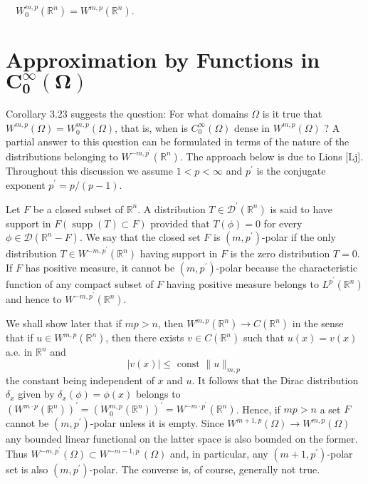 \begin{corollary}
  $\quad W_0^{m, p}\left(\mathbb{R}^n\right)=W^{m, p}\left(\mathbb{R}^n\right)$.
\end{corollary}


\section[Approximation by Functions in $C_0^\infty (\Omega)$]%
  {Approximation by Functions in $\bm{C_0^\infty (\Omega)}$}


\begin{para}
  Corollary 3.23 suggests the question: For what domains $\Omega$ is it true that $W^{m, p}(\Omega)=W_0^{m, p}(\Omega)$, that is, when is $C_0^{\infty}(\Omega)$ dense in $W^{m, p}(\Omega)$ ? A partial answer to this question can be formulated in terms of the nature of the distributions belonging to $W^{-m, p^{\prime}}\left(\mathbb{R}^n\right)$. The approach below is due to Lions [Lj]. Throughout this discussion we assume $1<p<\infty$ and $p^{\prime}$ is the conjugate exponent $p^{\prime}=p /(p-1)$.
\end{para}

\begin{para}
  Let $F$ be a closed subset of $\mathbb{R}^n$. A distribution $T \in \mathscr{D}^{\prime}\left(\mathbb{R}^n\right)$ is said to have support in $F(\operatorname{supp}(T) \subset F)$ provided that $T(\phi)=0$ for every $\phi \in \mathscr{D}\left(\mathbb{R}^n-F\right)$. We say that the closed set $F$ is $\left(m, p^{\prime}\right)$-polar if the only distribution $T \in W^{-m, p^{\prime}}\left(\mathbb{R}^n\right)$ having support in $F$ is the zero distribution $T=0$. If $F$ has positive measure, it cannot be $\left(m, p^{\prime}\right)$-polar because the characteristic function of any compact subset of $F$ having positive measure belongs to $L^{p^{\prime}}\left(\mathbb{R}^n\right)$ and hence to $W^{-m, p^{\prime}}\left(\mathbb{R}^n\right)$.
\end{para}

We shall show later that if $m p>n$, then $W^{m, p}\left(\mathbb{R}^n\right) \rightarrow C\left(\mathbb{R}^n\right)$ in the sense that if $u \in W^{m, p}\left(\mathbb{R}^n\right)$, then there exists $v \in C\left(\mathbb{R}^n\right)$ such that $u(x)=v(x)$ a.e. in $\mathbb{R}^n$ and
\[
|v(x)| \leq \text { const }\|u\|_{m, p}
\]
the constant being independent of $x$ and $u$. It follows that the Dirac distribution $\delta_x$ given by $\delta_x(\phi)=\phi(x)$ belongs to $\left(W^{m \cdot p}\left(\mathbb{R}^n\right)\right)^{\prime}=\left(W_0^{m, p}\left(\mathbb{R}^n\right)\right)^{\prime}=W^{-m \cdot p^{\prime}}\left(\mathbb{R}^n\right)$. Hence, if $m p>n$ a set $F$ cannot be $\left(m, p^{\prime}\right)$-polar unless it is empty.
Since $W^{m+1, p}(\Omega) \rightarrow W^{m, p}(\Omega)$ any bounded linear functional on the latter space is also bounded on the former. Thus $W^{-m, p^{\prime}}(\Omega) \subset W^{-m-1, p^{\prime}}(\Omega)$ and, in particular, any $\left(m+1, p^{\prime}\right)$-polar set is also $\left(m, p^{\prime}\right)$-polar. The converse is, of course, generally not true.


